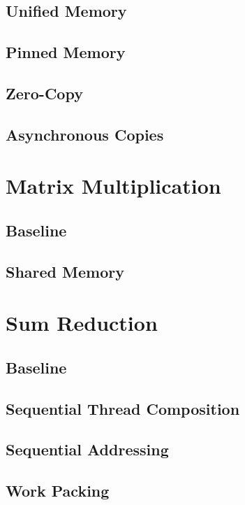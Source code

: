\documentclass[11pt,fancy,authoryear]{elegantbook}
\begin{document}
\section{Unified Memory}

\section{Pinned Memory}

\section{Zero-Copy}

\section{Asynchronous Copies}

\chapter{Matrix Multiplication}

\section{Baseline}

\section{Shared Memory}

\chapter{Sum Reduction}

\section{Baseline}

\section{Sequential Thread Composition}

\section{Sequential Addressing}

\section{Work Packing}
\end{document}
